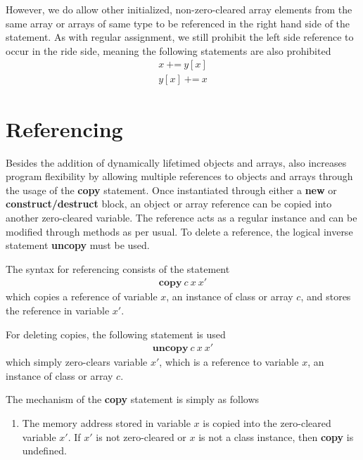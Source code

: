 However, we do allow other initialized, non-zero-cleared array elements from the same array or arrays of same type to be referenced in the right hand side of the statement. As with regular assignment, we still prohibit the left side reference to occur in the ride side, meaning the following statements are also prohibited
\begin{align*}
x\ \texttt{+=}\ y[x]\\
y[x]\ \texttt{+=}\ x
\end{align*}

\newpage
\section{Referencing}
\label{sec:referencing-layout}
Besides the addition of dynamically lifetimed objects and arrays, \rooplpp also increases program flexibility by allowing multiple references to objects and arrays through the usage of the \textbf{copy} statement. Once instantiated through either a \textbf{new} or \textbf{construct/destruct} block, an object or array reference can be copied into another zero-cleared variable. The reference acts as a regular instance and can be modified through methods as per usual. To delete a reference, the logical inverse statement \textbf{uncopy} must be used.

The syntax for referencing consists of the statement
\begin{align*}
    \textbf{copy}\ c\ x\ x'
\end{align*}
which copies a reference of variable $x$, an instance of class or array $c$, and stores the reference in variable $x'$.

For deleting copies, the following statement is used
\begin{align*}
    \textbf{uncopy}\ c\ x\ x'
\end{align*}    
which simply zero-clears variable $x'$, which is a reference to variable $x$, an instance of class or array $c$.

The mechanism of the \textbf{copy} statement is simply as follows
\begin{enumerate}
    \item The memory address stored in variable $x$ is copied into the zero-cleared variable $x'$. If $x'$ is not zero-cleared or $x$ is not a class instance, then \textbf{copy} is undefined.
\end{enumerate}

